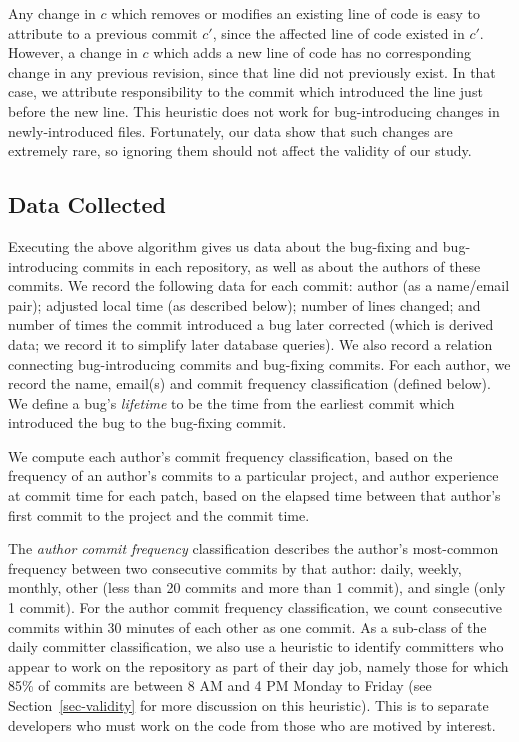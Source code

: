 Any change in $c$ which removes or modifies an existing line of code is easy to
attribute to a previous commit $c'$, since the affected line of code existed in
$c'$. However, a change in $c$ which adds a new line of code has no
corresponding change in any previous revision, since that line did not
previously exist. In that case, we attribute responsibility to the commit which
introduced the line just before the new line. This heuristic does not work for
bug-introducing changes in newly-introduced files. Fortunately, our data show
that such changes are extremely rare, so ignoring them should not affect the validity of our study. 

\subsection{Data Collected}
\label{sec:data}

Executing the above algorithm gives us data about the bug-fixing and
bug-introducing commits in each repository, as well as about the authors of
these commits. We record the following data for each commit: author (as a
name/email pair); adjusted local time (as described below); number of lines changed;
and number of times the commit introduced a bug later corrected (which is
derived data; we record it to simplify later database queries). We also record a
relation connecting bug-introducing commits and bug-fixing commits. For each
author, we record the name, email(s) and 
commit frequency classification (defined below). We define a
bug's {\em lifetime} to be the time from the earliest commit which introduced 
the bug to the bug-fixing commit.

We compute each author's commit frequency classification, based on the frequency of an
author's commits to a particular project, and author experience at commit time
for each patch, based on the elapsed time between that author's first commit to
the project and the commit time.

The {\em author commit frequency} classification describes the author's most-common
frequency between two consecutive commits by that author: daily, weekly, monthly, other (less than
20 commits and more than 1 commit), and single (only 1 commit). For the author commit frequency classification,
we count consecutive commits within 30 minutes of each other as one commit. As a
sub-class of the daily committer classification, we also use a heuristic to
identify committers who appear to work on the repository as part of their day
job, namely those for which 85\% of commits are between 8 AM and 4 PM Monday to
Friday (see Section~\ref{sec-validity} for more discussion on this heuristic). This is to separate developers who must work on the code from those who
are motived by interest.

